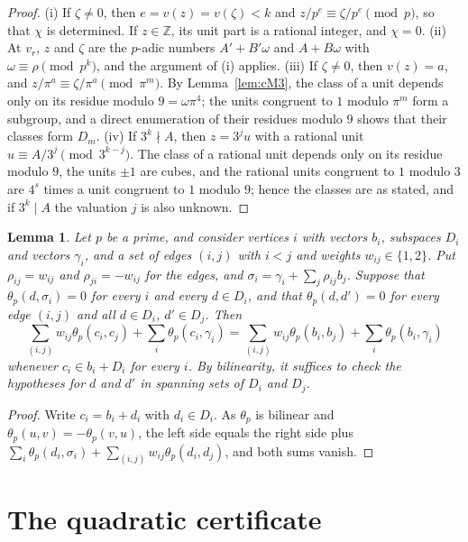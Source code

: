 \documentclass[11pt]{article}
\newtheorem{lemma}[theorem]{Lemma}
\newcommand{\Z}{\mathbb{Z}}
\begin{document}
\begin{proof}
(i) If $\zeta\neq0$, then $e=v(z)=v(\zeta)<k$ and $z/p^e\equiv\zeta/p^e\pmod p$, so that $\chi$ is determined. If $z\in\Z$, its unit part is a rational integer, and $\chi=0$. (ii) At $v_r$, $z$ and $\zeta$ are the $p$-adic numbers $A'+B'\omega$ and $A+B\omega$ with $\omega\equiv\rho\pmod{p^k}$, and the argument of (i) applies. (iii) If $\zeta\neq0$, then $v(z)=a$, and $z/\pi^a\equiv\zeta/\pi^a\pmod{\pi^m}$. By Lemma~\ref{lem:cM3}, the class of a unit depends only on its residue modulo $9=\omega\pi^4$; the units congruent to $1$ modulo $\pi^m$ form a subgroup, and a direct enumeration of their residues modulo $9$ shows that their classes form $D_m$. (iv) If $3^k\nmid A$, then $z=3^ju$ with a rational unit $u\equiv A/3^j\pmod{3^{k-j}}$. The class of a rational unit depends only on its residue modulo $9$, the units $\pm1$ are cubes, and the rational units congruent to $1$ modulo $3$ are $4^s$ times a unit congruent to $1$ modulo $9$; hence the classes are as stated, and if $3^k\mid A$ the valuation $j$ is also unknown.
\end{proof}

\begin{lemma}\label{lem:cenvelope}
Let $p$ be a prime, and consider vertices $i$ with vectors $b_i$, subspaces $D_i$ and vectors $\gamma_i$, and a set of edges $(i,j)$ with $i<j$ and weights $w_{ij}\in\{1,2\}$. Put $\rho_{ij}=w_{ij}$ and $\rho_{ji}=-w_{ij}$ for the edges, and $\sigma_i=\gamma_i+\sum_j\rho_{ij}b_j$. Suppose that $\theta_p(d,\sigma_i)=0$ for every $i$ and every $d\in D_i$, and that $\theta_p(d,d')=0$ for every edge $(i,j)$ and all $d\in D_i$, $d'\in D_j$. Then
\[
\sum_{(i,j)}w_{ij}\theta_p(c_i,c_j)+\sum_i\theta_p(c_i,\gamma_i)=\sum_{(i,j)}w_{ij}\theta_p(b_i,b_j)+\sum_i\theta_p(b_i,\gamma_i)
\]
whenever $c_i\in b_i+D_i$ for every $i$. By bilinearity, it suffices to check the hypotheses for $d$ and $d'$ in spanning sets of $D_i$ and $D_j$.
\end{lemma}

\begin{proof}
Write $c_i=b_i+d_i$ with $d_i\in D_i$. As $\theta_p$ is bilinear and $\theta_p(u,v)=-\theta_p(v,u)$, the left side equals the right side plus $\sum_i\theta_p(d_i,\sigma_i)+\sum_{(i,j)}w_{ij}\theta_p(d_i,d_j)$, and both sums vanish.
\end{proof}

\section{The quadratic certificate}
\end{document}
